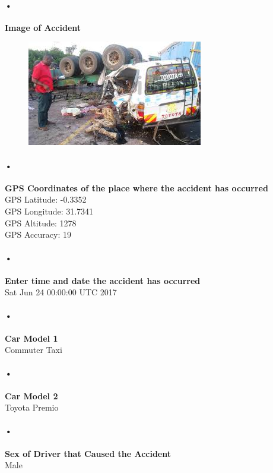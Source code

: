 \documentclass[12pt]{article}
\begin{document}
\paragraph{•}
\textbf{Image of Accident}\\
\begin{figure}
		\includegraphics[scale=0.9]{images.jpg} 
			\end{figure}

\paragraph{•}
\textbf{GPS Coordinates of the place where the accident has occurred}\\
GPS Latitude: -0.3352 \\
GPS Longitude: 31.7341\\
GPS Altitude: 1278\\
GPS Accuracy: 19\\

\paragraph{•}
\textbf{Enter time and date the accident has occurred}\\
Sat Jun 24 00:00:00 UTC 2017


\paragraph{•}
\textbf{Car Model 1}\\
Commuter Taxi

\paragraph{•}
\textbf{Car Model 2}\\
Toyota Premio

\paragraph{•}
\textbf{Sex of Driver that Caused the Accident}\\
Male
\end{document}
